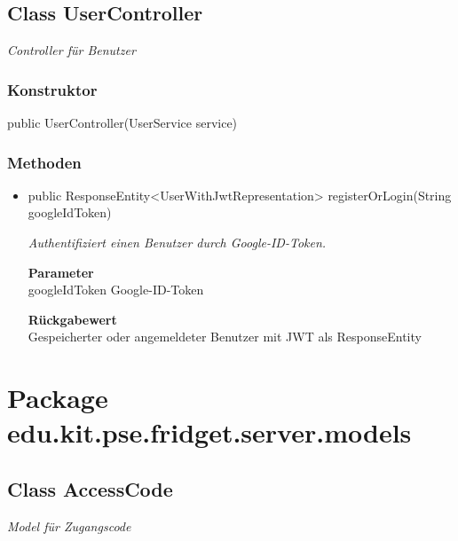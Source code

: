 \documentclass[a4paper]{scrreprt}
\begin{document}
        \subsection{Class UserController}
        \textit{Controller für Benutzer}
        \subsubsection{Konstruktor}
        public UserController(UserService service)
        \subsubsection{Methoden}
        \begin{itemize}
        	\item{public ResponseEntity<UserWithJwtRepresentation> registerOrLogin(String googleIdToken)}
        	
        	\textit{Authentifiziert einen Benutzer durch Google-ID-Token.}
        	
        	\textbf{Parameter} \\
        	googleIdToken Google-ID-Token
        	
        	\textbf{Rückgabewert} \\
        	Gespeicherter oder angemeldeter Benutzer mit JWT als ResponseEntity
        \end{itemize}
        \section{Package edu.kit.pse.fridget.server.models}
        \subsection{Class AccessCode}
        \textit{Model für Zugangscode}
\end{document}
